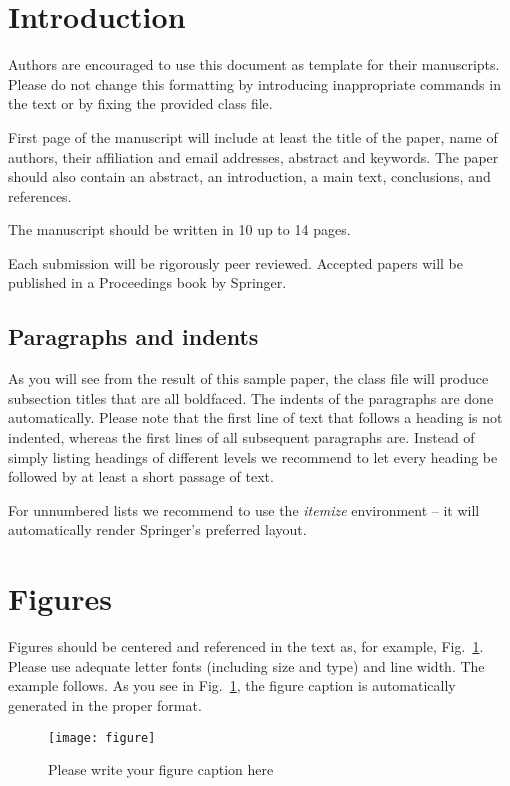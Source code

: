 \documentclass{svmult}
\begin{document}
\section{Introduction}

Authors are encouraged to use this document as template for their manuscripts. Please do not change this formatting by introducing inappropriate commands in the text or by fixing the provided class file.

First page of the manuscript will include at least the title of the paper, name of authors, their affiliation and email addresses, abstract and keywords. The paper should also contain an abstract, an introduction, a main text, conclusions, and references.

The manuscript should be written in 10 up to 14 pages.  

Each submission will be rigorously peer reviewed. Accepted papers will be published in a Proceedings book by Springer. 



\subsection{Paragraphs and indents}

As you will see from the result of this sample paper, the class file will produce subsection titles that are all boldfaced. The indents of the paragraphs are done automatically. Please note that the first line of text that follows a heading is not indented, whereas the first lines of all subsequent paragraphs are. Instead of simply listing headings of different levels we recommend to let every heading be followed by at least a short passage of text.

For unnumbered lists we recommend to use the \textit{itemize} environment -- it will automatically render Springer's preferred layout.

\section{Figures}

Figures should be centered and referenced in the text as, for example, Fig.~\ref{gear}. Please use adequate letter fonts (including size and type) and line width. The example follows. As you see in Fig.~\ref{gear}, the figure caption is automatically generated in the proper format.

\begin{figure}
\center
\texttt{[image: figure]}
\caption{Please write your figure caption here}\label{gear}
\end{figure}
\end{document}
